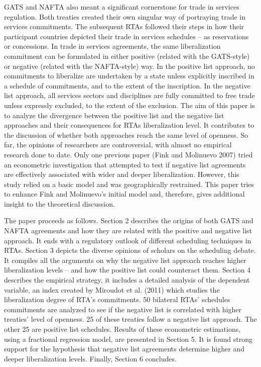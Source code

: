 \documentclass{article}
\begin{document}
\smallskip

GATS and NAFTA also meant a significant cornerstone for trade in services regulation. Both treaties created their own singular way of portraying trade in services commitments. The subsequent RTAs followed their steps in how their participant countries depicted their trade in services schedules – as reservations or concessions. In trade in services agreements, the same liberalization commitment can be formulated in either positive (related with the GATS-style) or negative (related with the NAFTA-style) way. In the positive list approach, no commitments to liberalize are undertaken by a state unless explicitly inscribed in a schedule of commitments, and to the extent of the inscription. In the negative list approach, all services sectors and disciplines are fully committed to free trade unless expressly excluded, to the extent of the exclusion. The aim of this paper is to analyze the divergence between the positive list and the negative list approaches and their consequences for RTAs liberalization level. It contributes to the discussion of whether both approaches reach the same level of openness. So far, the opinions of researchers are controversial, with almost no empirical research done to date. Only one previous paper (Fink and Molinuevo 2007) tried an econometric investigation that attempted to test if negative list agreements are effectively associated with wider and deeper liberalization. However, this study relied on a basic model and was geographically restrained. This paper tries to enhance Fink and Molinuevo's initial model and, therefore, gives additional insight to the theoretical discussion.

\smallskip

The paper proceeds as follows. Section 2 describes the origins of both GATS and NAFTA agreements and how they are related with the positive and negative list approach. It ends with a regulatory outlook of different scheduling techniques in RTAs. Section 3 depicts the diverse opinions of scholars on the scheduling debate. It compiles all the arguments on why the negative list approach reaches higher liberalization levels – and how the positive list could counteract them. Section 4 describes the empirical strategy, it includes a detailed analysis of the dependent variable, an index created by Miroudot et al. (2011) which studies the liberalization degree of RTA’s commitments. 50 bilateral RTAs’ schedules commitments are analyzed to see if the negative list is correlated with higher treaties’ level of openness. 25 of these treaties follow a negative list approach. The other 25 are positive list schedules. Results of these econometric estimations, using a fractional regression model, are presented in Section 5. It is found strong support for the hypothesis that negative list agreements determine higher and deeper liberalization levels. Finally, Section 6 concludes.
\end{document}
